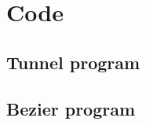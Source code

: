 \chapter{Code}
\label{app:code}
\section{Tunnel program}
\label{app:tunnel}


\section{Bezier program}
\label{app:bez}
